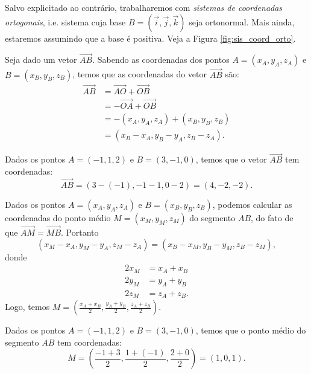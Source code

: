 Salvo explicitado ao contrário, trabalharemos com \emph{sistemas de coordenadas ortogonais}, i.e. sistema cuja base $B = (\vec{i},\vec{j},\vec{k})$ seja ortonormal. Mais ainda, estaremos assumindo que a base é positiva. Veja a Figura \ref{fig:sis_coord_orto}.

\begin{obs}
  Seja dado um vetor $\overrightarrow{AB}$. Sabendo as coordenadas dos pontos $A = (x_A,y_A,z_A)$ e $B = (x_B,y_B,z_B)$, temos que as coordenadas do vetor $\overrightarrow{AB}$ são:
  \begin{align}
    \overrightarrow{AB} &= \overrightarrow{AO} + \overrightarrow{OB}\\
                        &= -\overrightarrow{OA} + \overrightarrow{OB}\\
                        &= -(x_A,y_A,z_A)+(x_B,y_B,z_B)\\
                        &= (x_B-x_A,y_B-y_A,z_B-z_A).
  \end{align}
\end{obs}

\begin{ex}
  Dados os pontos $A = (-1,1,2)$ e $B = (3,-1,0)$, temos que o vetor $\overrightarrow{AB}$ tem coordenadas:
  \begin{equation}
    \overrightarrow{AB} = (3-(-1),-1-1,0-2) = (4,-2,-2).
  \end{equation}
\end{ex}

\begin{obs}
  Dados os pontos $A = (x_A,y_A,z_A)$ e $B = (x_B,y_B,z_B)$, podemos calcular as coordenadas do ponto médio $M = (x_M,y_M,z_M)$ do segmento $AB$, do fato de que $\overrightarrow{AM} = \overrightarrow{MB}$. Portanto
  \begin{equation}
    (x_M-x_A,y_M-y_A,z_M-z_A)=(x_B-x_M,y_B-y_M,z_B-z_M),
  \end{equation}
  donde
  \begin{align}
    2x_M &= x_A+x_B\\
    2y_M &= y_A+y_B\\
    2z_M &= z_A+z_B.
  \end{align}
  Logo, temos $\displaystyle M = \left(\frac{x_A+x_B}{2},\frac{y_A+y_B}{2},\frac{z_A+z_B}{2}\right)$.
\end{obs}

\begin{ex}
  Dados os pontos $A = (-1,1,2)$ e $B = (3,-1,0)$, temos que o ponto médio do segmento $AB$ tem coordenadas:
  \begin{equation}
    M = \left(\frac{-1+3}{2},\frac{1+(-1)}{2},\frac{2+0}{2}\right) = (1,0,1).
  \end{equation}
\end{ex}


